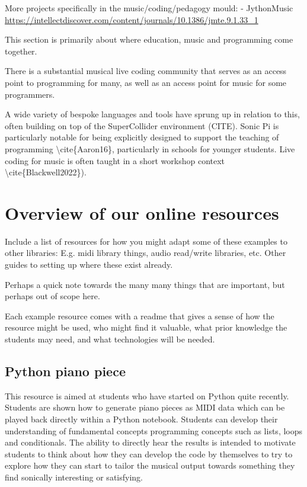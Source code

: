 More projects specifically in the music/coding/pedagogy mould:
 - JythonMusic \url{https://intellectdiscover.com/content/journals/10.1386/jmte.9.1.33_1}

 This section is primarily about where education, music and programming come together.


 There is a substantial musical live coding community that serves as an access point to programming for many, as well as an access point for music for some programmers.


A wide variety of bespoke languages and tools have sprung up in relation to this, often building on top of the SuperCollider environment (CITE). Sonic Pi is particularly notable for being explicitly designed to support the teaching of programming \textbackslash{}cite\{Aaron16\}, particularly in schools for younger students. Live coding for music is often taught in a short workshop context \textbackslash{}cite\{Blackwell2022\}).



\section{Overview of our online resources} \label{sec:resources}


Include a list of resources for how you might adapt some of these examples to other libraries:
E.g. midi library things, audio read/write libraries, etc.
Other guides to setting up where these exist already.

Perhaps a quick note towards the many many things that are important, but perhaps out of scope here.

Each example resource comes with a readme that gives a sense of how the resource might be used, who might find it valuable, what prior knowledge the students may need, and what technologies will be needed.

\subsection{Python piano piece}
This resource is aimed at students who have started on Python quite recently. Students are shown how to generate piano pieces as MIDI data which can be played back directly within a Python notebook. Students can develop their understanding of fundamental concepts programming concepts such as lists, loops and conditionals. The ability to directly hear the results is intended to motivate students to think about how they can develop the code by themselves to try to explore how they can start to tailor the musical output towards something they find sonically interesting or satisfying.

